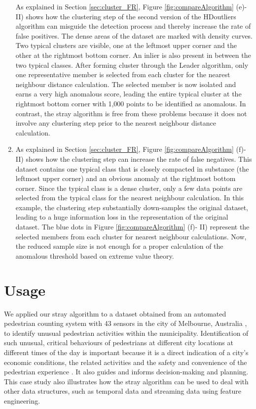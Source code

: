 \documentclass[11pt,a4paper,]{article}
\theoremstyle{definition}
\theoremstyle{definition}
\theoremstyle{definition}
\theoremstyle{remark}
\begin{document}
\begin{enumerate}
  As explained in Section \ref{sec:cluster_FR}, Figure \ref{fig:compareAlgorithm} (e)- II) shows how the clustering step of the second version of the HDoutliers algorithm can misguide the detection process and thereby increase the rate of false positives. The dense areas of the dataset are marked with density curves. Two typical clusters are visible, one at the leftmost upper corner and the other at the rightmost bottom corner. An inlier is also present in between the two typical classes. After forming cluster through the Leader algorithm, only one representative member is selected from each cluster for the nearest neighbour distance calculation. The selected member is now isolated and earns a very high anomalous score, leading the entire typical cluster at the rightmost bottom corner with 1,000 points to be identified as anomalous. In contrast, the stray algorithm is free from these problems because it does not involve any clustering step prior to the nearest neighbour distance calculation.
\item
  As explained in Section \ref{sec:cluster_FR}, Figure \ref{fig:compareAlgorithm} (f)- II) shows how the clustering step can increase the rate of false negatives. This dataset contains one typical class that is closely compacted in substance (the leftmost upper corner) and an obvious anomaly at the rightmost bottom corner. Since the typical class is a dense cluster, only a few data points are selected from the typical class for the nearest neighbour calculation. In this example, the clustering step substantially down-samples the original dataset, leading to a huge information loss in the representation of the original dataset. The blue dots in Figure \ref{fig:compareAlgorithm} (f)- II) represent the selected members from each cluster for nearest neighbour calculations. Now, the reduced sample size is not enough for a proper calculation of the anomalous threshold based on extreme value theory.
\end{enumerate}

\hypertarget{usage}{%
\section{Usage}\label{usage}}

\label{sec:usage}

We applied our stray algorithm to a dataset obtained from an automated pedestrian counting system with 43 sensors in the city of Melbourne, Australia \autocite{city_Melb_2019,rwalkr2019}, to identify unusual pedestrian activities within the municipality. Identification of such unusual, critical behaviours of pedestrians at different city locations at different times of the day is important because it is a direct indication of a city's economic conditions, the related activities and the safety and convenience of the pedestrian experience \autocite{city_Melb_2019}. It also guides and informs decision-making and planning. This case study also illustrates how the stray algorithm can be used to deal with other data structures, such as temporal data and streaming data using feature engineering.
\end{document}
